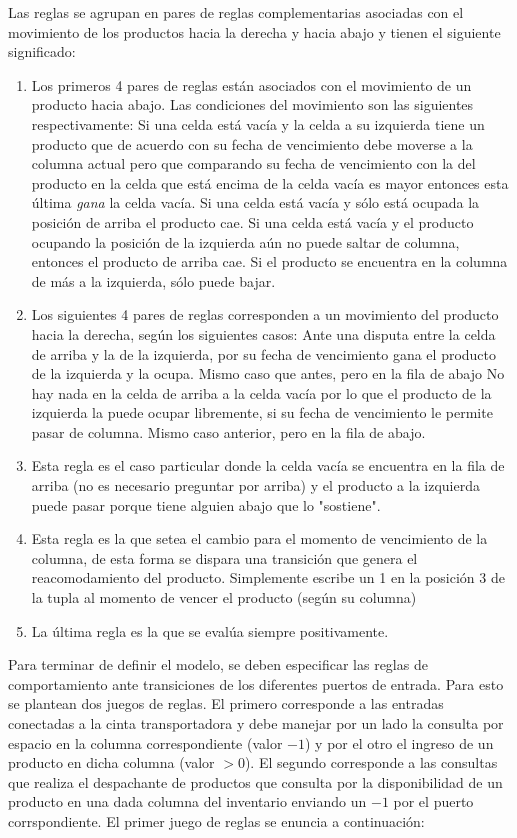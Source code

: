 \documentclass[10pt]{article}
\begin{document}
Las reglas se agrupan en pares de reglas complementarias asociadas con el movimiento de los productos hacia la derecha y hacia abajo y tienen el siguiente significado:
\begin{enumerate}
	\item Los primeros 4 pares de reglas están asociados con el movimiento de un producto hacia abajo. Las condiciones del movimiento son las siguientes respectivamente:
	\subitem Si una celda está vacía y la celda a su izquierda tiene un producto que de acuerdo con su fecha de vencimiento debe moverse a la columna actual pero que comparando su fecha de vencimiento con la del producto en la celda que está encima de la celda vacía es mayor entonces esta última \textit{gana} la celda vacía.
	\subitem Si una celda está vacía y sólo está ocupada la posición de arriba el producto cae.
	\subitem Si una celda está vacía y el producto ocupando la posición de la izquierda aún no puede saltar de columna, entonces el producto de arriba cae.
	\subitem Si el producto se encuentra en la columna de más a la izquierda, sólo puede bajar.
	\item Los siguientes 4 pares de reglas corresponden a un movimiento del producto hacia la derecha, según los siguientes casos:
	\subitem Ante una disputa entre la celda de arriba y la de la izquierda, por su fecha de vencimiento gana el producto de la izquierda y la ocupa.
	\subitem Mismo caso que antes, pero en la fila de abajo
	\subitem No hay nada en la celda de arriba a la celda vacía por lo que el producto de la izquierda la puede ocupar libremente, si su fecha de vencimiento le permite pasar de columna.
	\subitem Mismo caso anterior, pero en la fila de abajo.
	\item Esta regla es el caso particular donde la celda vacía se encuentra en la fila de arriba (no es necesario preguntar por arriba) y el producto a la izquierda puede pasar porque tiene alguien abajo que lo "sostiene".
	\item Esta regla es la que setea el cambio para el momento de vencimiento de la columna, de esta forma se dispara una transición que genera el reacomodamiento del producto. Simplemente escribe un 1 en la posición 3 de la tupla al momento de vencer el producto (según su columna) 
	\item La última regla es la que se evalúa siempre positivamente.
\end{enumerate}

Para terminar de definir el modelo, se deben especificar las reglas de comportamiento ante transiciones de los diferentes puertos de entrada. Para esto se plantean dos juegos de reglas. El primero corresponde a las entradas conectadas a la cinta transportadora y debe manejar por un lado la consulta por espacio en la columna correspondiente (valor $-1$) y por el otro el ingreso de un producto en dicha columna (valor $>0$). El segundo corresponde a las consultas que realiza el despachante de productos que consulta por la disponibilidad de un producto en una dada columna del inventario enviando un $-1$ por el puerto corrspondiente. El primer juego de reglas se enuncia a continuación:
\end{document}
